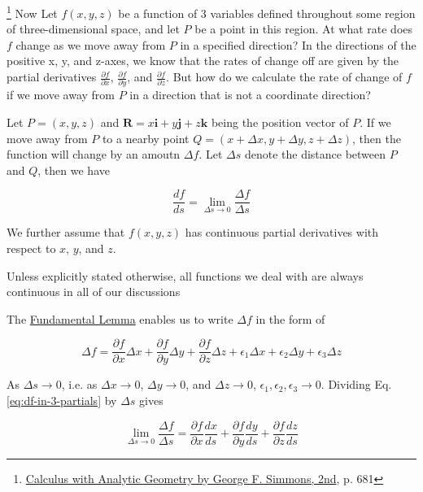 \footnote{\href{https://trello.com/c/byu9Pyy8}{Calculus with Analytic Geometry by George F. Simmons, 2nd}, p. 681} Now Let
$f(x, y, z)$ be a function of 3 variables defined throughout some region of three-dimensional space, and let $P$ be a
point in this region. At what rate does $f$ change as we move away from $P$ in a specified direction? In the directions
of the positive x, y, and z-axes, we know that the rates of change off are given by the partial derivatives
$\frac{\partial f}{\partial x}$, $\frac{\partial f}{\partial y}$, and $\frac{\partial f}{\partial z}$. But how do we
calculate the rate of change of $f$ if we move away from $P$ in a direction that is not a coordinate direction?

Let $P = (x, y, z)$ and $\boldsymbol{R} = x\boldsymbol{i} + y\boldsymbol{j} + z\boldsymbol{k}$ being the position vector
of $P$. If we move away from $P$ to a nearby point $Q = (x + \Delta x, y + \Delta y, z + \Delta z)$, then the function
will change by an amoutn $\Delta f$. Let $\Delta s$ denote the distance between $P$ and $Q$, then we have

\begin{equation}\label{eq:def-df-over-ds}
    \frac{df}{ds} = \lim\limits_{\Delta s \rightarrow 0}\frac{\Delta f}{\Delta s}
\end{equation}

We further assume that $f(x, y, z)$ has continuous partial derivatives with respect to $x$, $y$, and $z$.

\begin{marker}
    Unless explicitly stated otherwise, all functions we deal with are always continuous in all of our discussions
\end{marker}

The \hyperlink{fundamental-lemma}{Fundamental Lemma} enables us to write $\Delta f$ in the form of

\begin{equation}\label{eq:df-in-3-partials}
    \Delta f = \frac{\partial f}{\partial x}\Delta x + \frac{\partial f}{\partial y}\Delta y + \frac{\partial f}{\partial z}\Delta z + \epsilon_1\Delta x + \epsilon_2\Delta y + \epsilon_3\Delta z
\end{equation}

As $\Delta s \rightarrow 0$, i.e. as $\Delta x \rightarrow 0$, $\Delta y \rightarrow 0$, and $\Delta z \rightarrow 0$,
$\epsilon_1, \epsilon_2, \epsilon_3 \rightarrow 0$. Dividing Eq.\ref{eq:df-in-3-partials} by $\Delta s$ gives

\begin{equation}\label{eq:df-over-ds-in-3-partials}
    \lim\limits_{\Delta s \rightarrow 0}\frac{\Delta f}{\Delta s} = \frac{\partial f}{\partial x}\frac{dx}{ds} + \frac{\partial f}{\partial y}\frac{dy}{ds} + \frac{\partial f}{\partial z}\frac{dz}{ds}
\end{equation}

